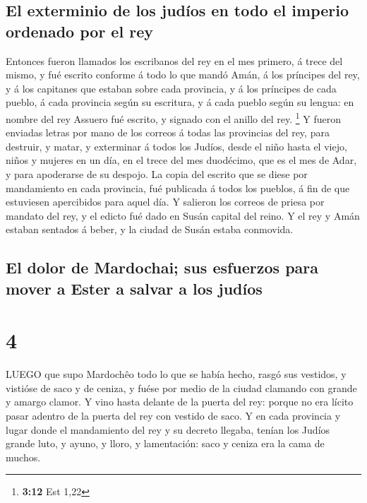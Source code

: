 \hypertarget{el-exterminio-de-los-juduxedos-en-todo-el-imperio-ordenado-por-el-rey}{%
\subsection{El exterminio de los judíos en todo el imperio ordenado por
el
rey}\label{el-exterminio-de-los-juduxedos-en-todo-el-imperio-ordenado-por-el-rey}}

 Entonces fueron llamados los escribanos del rey en el mes
primero, á trece del mismo, y fué escrito conforme á todo lo que mandó
Amán, á los príncipes del rey, y á los capitanes que estaban sobre cada
provincia, y á los príncipes de cada pueblo, á cada provincia según su
escritura, y á cada pueblo según su lengua: en nombre del rey Assuero
fué escrito, y signado con el anillo del rey. \footnote{\textbf{3:12}
  Est 1,22}  Y fueron enviadas letras por mano de los
correos á todas las provincias del rey, para destruir, y matar, y
exterminar á todos los Judíos, desde el niño hasta el viejo, niños y
mujeres en un día, en el trece del mes duodécimo, que es el mes de Adar,
y para apoderarse de su despojo.  La copia del escrito que
se diese por mandamiento en cada provincia, fué publicada á todos los
pueblos, á fin de que estuviesen apercibidos para aquel día.
 Y salieron los correos de priesa por mandato del rey, y el
edicto fué dado en Susán capital del reino. Y el rey y Amán estaban
sentados á beber, y la ciudad de Susán estaba conmovida.

\hypertarget{el-dolor-de-mardochai-sus-esfuerzos-para-mover-a-ester-a-salvar-a-los-juduxedos}{%
\subsection{El dolor de Mardochai; sus esfuerzos para mover a Ester a
salvar a los
judíos}\label{el-dolor-de-mardochai-sus-esfuerzos-para-mover-a-ester-a-salvar-a-los-juduxedos}}

\hypertarget{section-3}{%
\section{4}\label{section-3}}

 LUEGO que supo Mardochêo todo lo que se había hecho, rasgó
sus vestidos, y vistióse de saco y de ceniza, y fuése por medio de la
ciudad clamando con grande y amargo clamor.  Y vino hasta
delante de la puerta del rey: porque no era lícito pasar adentro de la
puerta del rey con vestido de saco.  Y en cada provincia y
lugar donde el mandamiento del rey y su decreto llegaba, tenían los
Judíos grande luto, y ayuno, y lloro, y lamentación: saco y ceniza era
la cama de muchos.


